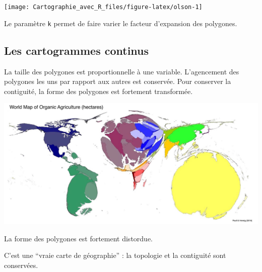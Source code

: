 \documentclass[]{book}
\let\BeginKnitrBlock\begin \let\EndKnitrBlock\end
\begin{document}
\begin{center}\texttt{[image: Cartographie\_avec\_R\_files/figure-latex/olson-1]} \end{center}

Le paramètre \texttt{k} permet de faire varier le facteur d'expansion
des polygones.

\subsection{Les cartogrammes continus}\label{les-cartogrammes-continus}

La taille des polygones est proportionnelle à une variable. L'agencement
des polygones les uns par rapport aux autres est conservée. Pour
conserver la contiguité, la forme des polygones est fortement
transformée.

\begin{center}\includegraphics[width=26.67in]{img/cartogram} \end{center}

\citep{Paull16}

\BeginKnitrBlock{rmdmoins}
La forme des polygones est fortement distordue.
\EndKnitrBlock{rmdmoins}

\BeginKnitrBlock{rmdplus}
C'est une ``vraie carte de géographie'' : la topologie et la contiguité
sont conservées.
\EndKnitrBlock{rmdplus}
\end{document}
